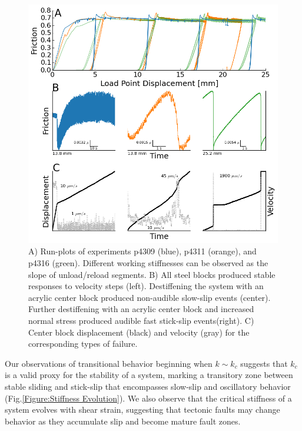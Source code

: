 \documentclass[11pt]{article}
\begin{document}
\begin{figure}
	\centering
		\includegraphics[scale=0.7]{../Figures/Fig_Runplot/runplot.png}
   	\caption{A) Run-plots of experiments p4309 (blue), p4311 (orange), and p4316
   	(green). Different working stiffnesses can be observed as the slope of
   	unload/reload segments. B) All steel blocks produced stable responses to
   	velocity steps (left). Destiffening the system with an acrylic center block
   	produced non-audible slow-slip events (center). Further destiffening with an
   	acrylic center block and increased normal stress produced audible fast
   	stick-slip events(right). C) Center block displacement (black) and velocity
   	(gray) for the corresponding types of failure.}
  	\label{Figure:Runplot}
\end{figure}

Our observations of transitional behavior beginning when $k \sim k_c$ suggests
that $k_c$ is a valid proxy for the stability of a system, marking a transitory
zone between stable sliding and stick-slip that encompasses slow-slip and
oscillatory behavior (Fig.\ref{Figure:Stiffness Evolution}). We also observe that the critical stiffness of a system
evolves with shear strain, suggesting that tectonic faults may change behavior
as they accumulate slip and become mature fault zones.
\end{document}
